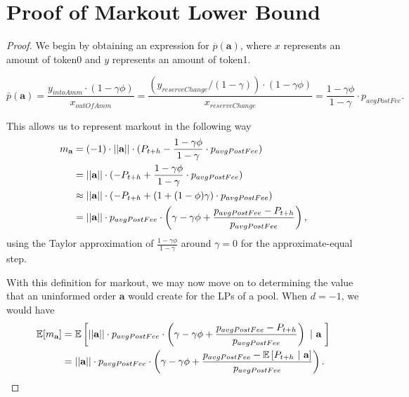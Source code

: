 \section{Proof of Markout Lower Bound} \label{appendix:markout-lb-proof}

\begin{proof}
        We begin by obtaining an expression for $\overline p(\textbf{a})$, where $x$ represents an amount of token0 and $y$ represents an amount of token1.

            $$\bar p(\textbf{a}) = \frac{y_{intoAmm} \cdot (1-\gamma\phi)}{x_{outOfAmm}} = \frac{(y_{reserveChange}/(1-\gamma)) \cdot (1-\gamma \phi)}{x_{reserveChange}} = \frac{1-\gamma\phi}{1-\gamma} \cdot p_{avgPostFee}.$$
        
        This allows us to represent markout in the following way
        \begin{align*}
            m_{\textbf a} 
                & = (-1) \cdot ||\textbf{a}|| \cdot (P_{t+h} - \frac{1-\gamma\phi}{1-\gamma} \cdot p_{avgPostFee}) \\
                & = ||\textbf{a}|| \cdot (- P_{t+h} + \frac{1-\gamma\phi}{1-\gamma} \cdot p_{avgPostFee}) \\
                & \approx ||\textbf{a}|| \cdot (- P_{t+h} + (1 + (1-\phi)\gamma) \cdot p_{avgPostFee}) \\
                & = ||\textbf{a}|| \cdot p_{avgPostFee} \cdot \left( \gamma - \gamma \phi + \frac{p_{avgPostFee} - P_{t+h}}{p_{avgPostFee}} \right),
        \end{align*}
        using the Taylor approximation of $\frac{1-\gamma \phi}{1-\gamma}$ around $\gamma=0$ for the approximate-equal step.

        With this definition for markout, we may now move on to determining the value that an uninformed order $\textbf{a}$ would create for the LPs of a pool. When $d=-1$, we would have
        \begin{align*}
            \mathbb E[m_\textbf a] 
                & = \mathbb E \left[
                    ||\textbf{a}|| \cdot p_{avgPostFee} \cdot \left( \gamma - \gamma \phi + \frac{p_{avgPostFee} - P_{t+h}}{p_{avgPostFee}} \right) \ | \ \textbf a \ 
                \right] \\
                & = ||\textbf{a}|| \cdot p_{avgPostFee} \cdot \left( \gamma - \gamma \phi + \frac{p_{avgPostFee} - \mathbb E \left[P_{t+h} \ | \ \textbf a \right]}{p_{avgPostFee}} \right).
        \end{align*}


\end{proof}
